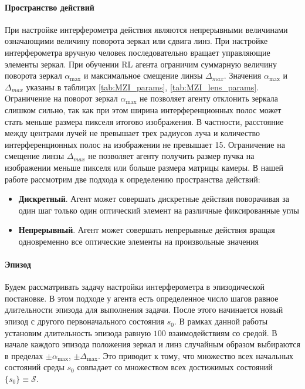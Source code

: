 \paragraph{Пространство действий}
При настройке интерферометра действия являются непрерывными величинами означающими величину поворота зеркал или сдвига линз. При настройке интерферометра вручную человек последовательно вращает управляющие элементы зеркал. При обучении RL агента ограничим суммарную величину поворота зеркал $\alpha_{\max}$ и максимальное смещение линзы $\Delta_{max}$. Значения $\alpha_{\max}$ и $\Delta_{max}$ указаны в таблицах \ref{tab:MZI_params}, \ref{tab:MZI_lens_params}. Ограничение на поворот зеркал $\alpha_{\max}$ не позволяет агенту отклонить зеркала слишком сильно, так как при этом ширина интерференционных полос может стать меньше размера пикселя итогово изображения. В частности, расстояние между центрами лучей не превышает трех радиусов луча и количество интерференционных полос на изображении не превышает 15. Ограничение на смещение линзы $\Delta_{max}$ не позволяет агенту получить размер пучка на изображении меньше пикселя или больше размера матрицы камеры. В нашей работе рассмотрим две подхода к определению пространства действий:

\begin{itemize}
    \item \textbf{Дискретный}. Агент может совершать дискретные действия поворачивая за один шаг только один оптический элемент на различные фиксированные углы
    \item \textbf{Непрерывный}. Агент может совершать непрерывные действия вращая одновременно все оптические элементы на произвольные значения
\end{itemize}

\paragraph{Эпизод}
Будем рассматривать задачу настройки интерферометра в эпизодической постановке. В этом подходе у агента есть определенное число шагов равное длительности эпизода для выполнения задачи. После этого начинается новый эпизод с другого первоначального состояния $s_0$. В рамках данной работы установим длительность эпизода равную $100$ взаимодействиям со средой. В начале каждого эпизода положения зеркал и линз случайным образом выбираются в пределах  $\pm\alpha_{\max}$, $\pm\Delta_{\max}$. Это приводит к тому, что множество всех начальных состояний среды $s_0$ совпадает со множеством всех достижимых состояний $\{s_0\} \equiv \mathcal{S}$. 

